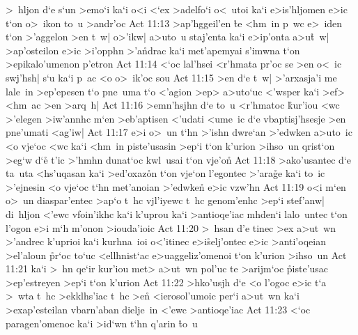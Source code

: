 >~hljon
d`e
s`un
>emo`i
ka`i
o<i
<`ex
>adelfo`i
o<~utoi
ka`i
e>is'hljomen
e>ic
t`on
o>~ikon
to~u
>andr'oc\bibvsend
\vs Act 11:13
>ap'hggeil'en
\r{t}e
<hm~in
p~wc
e>~iden
t`on
>'aggelon
>en
t~w|
o>'ikw|
a>uto~u
staj'enta
ka`i
e>ip'onta
a>u\r{t}~w|
>ap'osteilon
e>ic
>i'opphn
>'a\r{n}drac
ka`i
met'apemyai
s'imwna
t`on
>epikalo'umenon
p'etron\bibvsend
\vs Act 11:14
<`oc
lal'hsei
<r'hmata
pr'oc
se
>en
o<~ic
swj'hsh|
s`u
ka`i
p~ac
<o
o>~ik'oc
sou\bibvsend
\vs Act 11:15
>en
d`e
t~w|
>'arxasja'i
me
lale~in
>ep'epesen
t`o
pne~uma
t`o
<'agion
>ep>
a>uto`uc
<'wsper
ka`i
>ef>
<hm~ac
>en
>arq~h|\bibvsend
\vs Act 11:16
>emn'hsjhn
d`e
to~u
<r'hmatoc
\r{k}ur'iou
<wc
>'elegen
>iw'annhc
m`en
>eb'aptisen
<'udati
<ume~ic
d`e
vbaptisj'hsesje
>en
pne'umati
<ag'iw|\bibvsend
\vs Act 11:17
e>i
o>~un
t`hn
>'ishn
dwre`an
>'edwken
a>uto~ic
<o
vje`oc
<wc
ka`i
<hm~in
piste'usasin
>ep`i
t`on
k'urion
>ihso~un
qrist`on
>eg`w
d`e\r{}
t'ic
>'hmhn
dunat`oc
kwl~usai
t`on
vje'o\r{n}\bibvsend
{}
\vs Act 11:18
>ako'usantec
d`e
ta~uta
<hs'uqasan
ka`i
>ed'oxaz\r{o}n
t`on
vje`on
l'egontec
>'ara\r{g}e
ka`i
to~ic
>'ejnesin
<o
vje`oc
t`hn
met'anoian
>'edwken\r{}
e>ic
vzw'hn\bibvsend
\vs Act 11:19
o<i
m`en
o>~un
diaspar'entec
>ap`o
t~hc
vjl'iyewc
t~hc
genom'enhc
>ep`i
stef'anw|
di~hljon
<'ewc
vfoin'ikhc
ka`i
k'uprou
ka`i
>antioqe'iac
mhden`i
lalo~untec
t`on
l'ogon
e>i
m`h
m'onon
>iouda'ioic\bibvsend
\vs Act 11:20
>~hsan
d'e
tinec
>ex
a>ut~wn
>'andrec
k'uprioi
ka`i
kurhna~ioi
o<'itinec
e>i\r{s}elj'ontec
e>ic
>anti'oqeian
>el'aloun
\r{p}r`oc
to`uc
<ellhnist`ac
e>uaggeliz'omenoi
t`on
k'urion
>ihso~un\bibvsend
\vs Act 11:21
ka`i
>~hn
qe`ir
kur'iou
met>
a>ut~wn
pol'uc
te
>arijm`oc
\r{p}iste'usac
>ep'estreyen
>ep`i
t`on
k'urion\bibvsend
\vs Act 11:22
>hko'usjh
d`e
<o
l'ogoc
e>ic
t`a
>~wta
t~hc
>ekklhs'iac
t~hc
>en\r{}
<ierosol'umoic
per`i
a>ut~wn
ka`i
>exap'esteilan
vbarn'aban
dielje~in
<'ewc
>antioqe'iac\bibvsend
\vs Act 11:23
<`oc
paragen'omenoc
ka`i
>id`wn
t`hn
q'arin
\r{t}o~u
